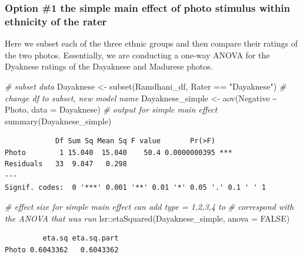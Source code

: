 \documentclass[
  11pt,
]{book}
\newenvironment{Shaded}{\begin{snugshade}}{\end{snugshade}}
\newcommand{\AttributeTok}[1]{\textcolor[rgb]{0.77,0.63,0.00}{#1}}
\newcommand{\CommentTok}[1]{\textcolor[rgb]{0.56,0.35,0.01}{\textit{#1}}}
\newcommand{\ConstantTok}[1]{\textcolor[rgb]{0.00,0.00,0.00}{#1}}
\newcommand{\FunctionTok}[1]{\textcolor[rgb]{0.00,0.00,0.00}{#1}}
\newcommand{\NormalTok}[1]{#1}
\newcommand{\OtherTok}[1]{\textcolor[rgb]{0.56,0.35,0.01}{#1}}
\newcommand{\SpecialCharTok}[1]{\textcolor[rgb]{0.00,0.00,0.00}{#1}}
\newcommand{\StringTok}[1]{\textcolor[rgb]{0.31,0.60,0.02}{#1}}
\begin{document}
\hypertarget{option-1-the-simple-main-effect-of-photo-stimulus-within-ethnicity-of-the-rater}{%
\subsubsection{Option \#1 the simple main effect of photo stimulus within ethnicity of the rater}\label{option-1-the-simple-main-effect-of-photo-stimulus-within-ethnicity-of-the-rater}}

Here we subset each of the three ethnic groups and then compare their ratings of the two photos. Essentially, we are conducting a one-way ANOVA for the Dyaknese ratings of the Dayaknese and Madurese photos.

\begin{Shaded}
\begin{Highlighting}[]
\CommentTok{\# subset data}
\NormalTok{Dayaknese }\OtherTok{\textless{}{-}} \FunctionTok{subset}\NormalTok{(Ramdhani\_df, Rater }\SpecialCharTok{==} \StringTok{"Dayaknese"}\NormalTok{)}
\CommentTok{\# change df to subset, new model name}
\NormalTok{Dayaknese\_simple }\OtherTok{\textless{}{-}} \FunctionTok{aov}\NormalTok{(Negative }\SpecialCharTok{\textasciitilde{}}\NormalTok{ Photo, }\AttributeTok{data =}\NormalTok{ Dayaknese)}
\CommentTok{\# output for simple main effect}
\FunctionTok{summary}\NormalTok{(Dayaknese\_simple)}
\end{Highlighting}
\end{Shaded}

\begin{verbatim}
            Df Sum Sq Mean Sq F value       Pr(>F)    
Photo        1 15.040  15.040    50.4 0.0000000395 ***
Residuals   33  9.847   0.298                         
---
Signif. codes:  0 '***' 0.001 '**' 0.01 '*' 0.05 '.' 0.1 ' ' 1
\end{verbatim}

\begin{Shaded}
\begin{Highlighting}[]
\CommentTok{\# effect size for simple main effect can add \textquotesingle{}type = 1,2,3,4\textquotesingle{} to}
\CommentTok{\# correspond with the ANOVA that was run}
\NormalTok{lsr}\SpecialCharTok{::}\FunctionTok{etaSquared}\NormalTok{(Dayaknese\_simple, }\AttributeTok{anova =} \ConstantTok{FALSE}\NormalTok{)}
\end{Highlighting}
\end{Shaded}

\begin{verbatim}
         eta.sq eta.sq.part
Photo 0.6043362   0.6043362
\end{verbatim}
\end{document}
